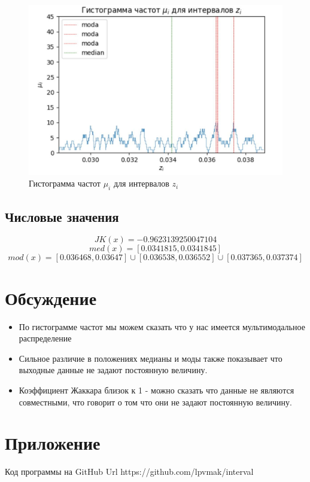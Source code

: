 \documentclass[12pt,a4paper]{article}
\begin{document}
    \begin{figure}[H]
        \centering
        \includegraphics[width=16cm]{3_3.png}
        \caption{Гистограмма частот $\mu_i$ для интервалов $z_i$}
        \label{fig:box_z}
    \end{figure}

    
    
    \subsection{Числовые значения}

    \[  JK(x) = −0.9623139250047104  \]
    \[    med(x) =  [0.0341815, 0.0341845]  \]
    \[    mod(x) = [0.036468, 0.03647] \cup [0.036538, 0.036552] \cup [0.037365, 0.037374]  \]

    \section{Обсуждение}
    \begin{itemize}
        \item По гистограмме частот мы можем сказать что у нас имеется мультимодальное распределение
        \item Сильное различие в положениях медианы и моды также показывает что
выходные данные не задают постоянную величину.
        \item Коэффициент Жаккара близок к 1 - можно сказать что данные не являются совместными, что говорит о том что они не задают постоянную величину.
    \end{itemize}
    \section{Приложение}
        Код программы на GitHub Url https://github.com/lpvmak/interval
\end{document}
